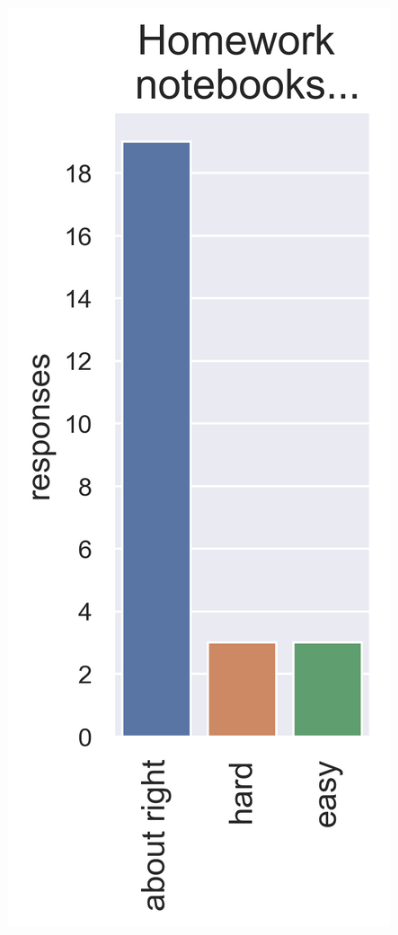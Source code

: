 \documentclass[aspectratio=169, handout]{beamer}
\begin{document}
\begin{frame}[t]
\begin{columns}
\begin{figure}
\includegraphics[width=0.9\textwidth]{survey_hw}
\caption*{}
\end{figure}


\end{columns}
\end{frame}
\end{document}
